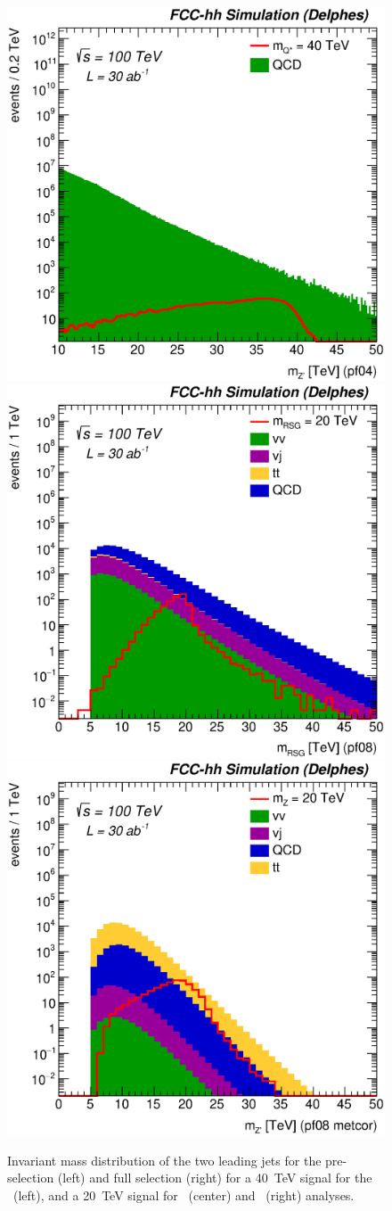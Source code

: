 \begin{figure}[!htb]
  \centering
  \includegraphics[width=0.32\columnwidth]{Fig/Mj1j2_pf04_sel1_nostack_log.eps}
  \includegraphics[width=0.32\columnwidth]{Fig/Mj1j2_pf08_fit_sel4_nostack_log.eps}
  \includegraphics[width=0.32\columnwidth]{Fig/Mj1j2_pf08_MetCorr_fit_sel8_nostack_log.eps}
  \caption{Invariant mass distribution of the two leading jets for the pre-selection (left) and full selection (right) for a 40~TeV signal for the \qjj\ (left), and a 20~TeV signal for \rsg\ (center) and \zptt\ (right) analyses.}
  \label{figure:hadronicresonances:ttsel08}
\end{figure}


